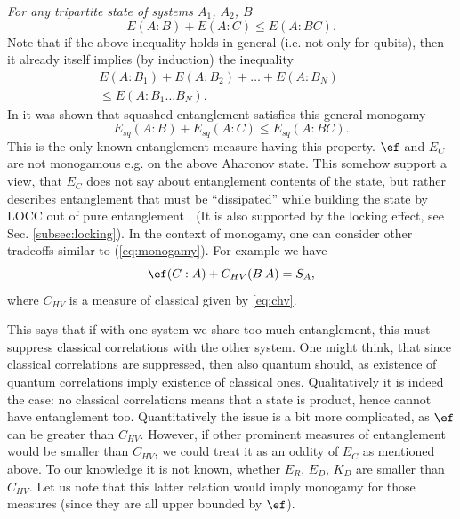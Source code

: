 \documentclass[twocolumn,aps,rmp]{revtex4}
\begin{document}
{\it For any tripartite state of systems $A_1$,  $A_2$, $B$}
\begin{equation}
E(A:B) + E(A:C) \leq E(A:BC).
\label{eq:monogamy}
\end{equation}
Note that if the above inequality holds in general (i.e. not only for
qubits), then it already itself implies (by induction) the inequality
\begin{eqnarray}
  E(A:B_1) + E(A:B_2) + \ldots + E(A:B_N) \qquad \nonumber \\
  \leq E(A:B_1\ldots B_N).
\end{eqnarray}
In \cite{KoashiW-monogamy} it was shown that squashed entanglement
satisfies this general monogamy
\begin{equation}
E_{sq}(A:B) + E_{sq}(A:C) \leq E_{sq}(A:BC).
\label{eq:monogamy-sq}
\end{equation}
This is the only known entanglement measure having this property.
$\ef$ and $E_C$ are not monogamous \cite{CoffmanKW-tangle,KoashiW-monogamy}
e.g. on the above Aharonov state. This somehow support a view, that
$E_C$ does not say about entanglement contents of the state, but
rather describes entanglement that must be ``dissipated'' while
building the state by LOCC out of pure entanglement
\cite{thermo-ent2002,SynakHH04}. (It is also supported by the locking effect, see Sec. \ref{subsec:locking}). In the context of monogamy, one can
consider other tradeoffs similar to (\ref{eq:monogamy}). For example
we have \cite{KoashiW-monogamy}
\begin{equation}
\ef(C:A) + C_{HV}(B\>A) = S_A,
\end{equation}
where $C_{HV}$ is a measure of classical \cite{HendersonVedral} given
by \ref{eq:chv}.

This says that if with one system we share too much entanglement, this
must suppress classical correlations with the other system. One might
think, that since classical correlations are suppressed, then also
quantum should, as existence of quantum correlations imply existence
of classical ones. Qualitatively it is indeed the case: no classical
correlations means that a state is product, hence cannot have
entanglement too. Quantitatively the issue is a bit more complicated,
as $\ef$ can be greater than $C_{HV}$. However, if other prominent
measures of entanglement would be smaller than $C_{HV}$, we could
treat it as an oddity of $E_C$ as mentioned above.  To our knowledge
it is not known, whether $E_R$, $E_D$, $K_D$ are smaller
than $C_{HV}$. Let us note that this latter relation would imply
monogamy for those measures (since they are all upper bounded by
$\ef$).
\end{document}
